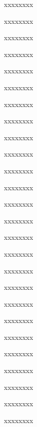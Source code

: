 \begin{inparaenum}
  \pb {} xxxx\pa xxxx%
  
  \pb {} xxxx\pa xxxx%
  
  \pb {} xxxx\pa xxxx%
  
  \pb {} xxxx\pa xxxx%
  
  \pb {} xxxx\pa xxxx%
  
  \pb {} xxxx\pa xxxx%
  
  \pb {} xxxx\pa xxxx%
  
  \pb {} xxxx\pa xxxx%
  
  \pb {} xxxx\pa xxxx%
  
  \pb {} xxxx\pa xxxx%
  
  \pb {} xxxx\pa xxxx%
  
  \pb {} xxxx\pa xxxx%
  
  \pb {} xxxx\pa xxxx%
  
  \pb {} xxxx\pa xxxx%
  
  \pb {} xxxx\pa xxxx%
  
  \pb {} xxxx\pa xxxx%
  
  \pb {} xxxx\pa xxxx%
  
  \pb {} xxxx\pa xxxx%
  
  \pb {} xxxx\pa xxxx%
  
  \pb {} xxxx\pa xxxx%
  
  \pb {} xxxx\pa xxxx%
  
  \pb {} xxxx\pa xxxx%
  
  \pb {} xxxx\pa xxxx%
  
  \pb {} xxxx\pa xxxx%
  
  \pb {} xxxx\pa xxxx%
  
  \pb {} xxxx\pa xxxx%
\end{inparaenum}
